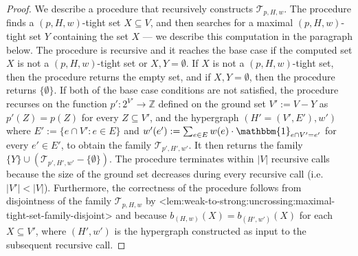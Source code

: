 \documentclass{article}
\def\Cref#1{<#1>}%
\newcommand{\indicator}{\ensuremath{\mathbbm{1}}\xspace}
\newcommand{\maximalTightSetFamily}[1]{\ensuremath{\calT_{#1}}\xspace}
\providecommand{\Z}{\mathbb{Z}}
\providecommand{\calT}{\mathcal{T}}
\begin{document}
\lemComputingMaximalTightSetFamily*
\begin{proof}
We describe a procedure that recursively constructs \maximalTightSetFamily{p, H, w}. The procedure finds a $(p, H, w)$-tight set $X\subseteq V$, and then searches for a maximal $(p, H, w)$-tight set $Y$ containing the set $X$ --- we describe this computation in the paragraph below. 
The procedure is recursive and it reaches the base case if 
the computed set $X$ is not a $(p, H, w)$-tight set or $X,Y = \emptyset$. If $X$ is not a $(p, H, w)$-tight set, then the procedure returns the empty set, and if $X,Y = \emptyset$, then the procedure returns $\{\emptyset\}$.
If both of the base case conditions are not satisfied, the procedure recurses on the function $p':2^{V'}\rightarrow\Z$ defined on the ground set $V':=V - Y$ as $p'(Z) = p(Z)$ for every $Z \subseteq V'$, and the hypergraph $(H' = (V', E'), w')$ where $E' := \{e \cap V' : e \in E\}$ and $w'(e'):= \sum_{e \in E}w(e)\cdot\indicator_{e\cap V' = e'}$ for every $e' \in E'$, to obtain the family $\maximalTightSetFamily{p', H', w'}$.
It then returns the family $\{Y\} \cup (\maximalTightSetFamily{p', H', w'} - \{\emptyset\})$. 
The procedure terminates within $|V|$ recursive calls because the size of the ground set decreases during every recursive call (i.e. $|V'| < |V|$). Furthermore, the correctness of the procedure follows from disjointness of the family $\maximalTightSetFamily{p, H, w}$ by \Cref{lem:weak-to-strong:uncrossing:maximal-tight-set-family-disjoint} and because $b_{(H,w)}(X) = b_{(H', w')}(X)$ for each $X \subseteq V'$, where $(H', w')$ is the hypergraph constructed as input to the subsequent recursive call.
    

\end{proof}
\end{document}
